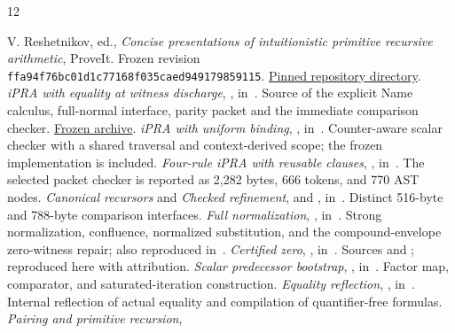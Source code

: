 \begin{thebibliography}{12}\raggedright
{}
V. Reshetnikov, ed., \emph{Concise presentations of intuitionistic primitive
recursive arithmetic}, ProveIt. Frozen revision
\texttt{ffa94f76bc01d1c77168f035caed949179859115}.
\href{https://github.com/VladimirReshetnikov/ProveIt/tree/ffa94f76bc01d1c77168f035caed949179859115/Logic/PrimitiveRecursiveArithmetic/ConciseIPRA}{Pinned repository directory}.
\emph{iPRA with equality at witness discharge},
,
in~\cite{baseline}. Source of the explicit Name calculus, full-normal
interface, parity packet and the immediate comparison checker.
\href{https://github.com/VladimirReshetnikov/ProveIt/blob/ffa94f76bc01d1c77168f035caed949179859115/Logic/PrimitiveRecursiveArithmetic/ConciseIPRA/docs/incoming/ipra_witness_discharge_2026-11-11.zip}{Frozen archive}.
\emph{iPRA with uniform binding},
,
in~\cite{baseline}. Counter-aware scalar checker with a shared traversal
and context-derived scope; the frozen implementation is included.
\emph{Four-rule iPRA with reusable clauses},
,
in~\cite{baseline}. The selected packet checker is reported as
2,282 bytes, 666 tokens, and 770 AST nodes.
\emph{Canonical recursors} and \emph{Checked refinement},
and ,
in~\cite{baseline}. Distinct 516-byte and 788-byte comparison interfaces.
\emph{Full normalization}, ,
in~\cite{baseline}. Strong normalization, confluence, normalized substitution,
and the compound-envelope zero-witness repair; also reproduced in~\cite{prior}.
\emph{Certified zero}, ,
in~\cite{baseline}. Sources  and
; reproduced here with attribution.
\emph{Scalar predecessor bootstrap},
,
in~\cite{baseline}. Factor map, comparator, and saturated-iteration construction.
\emph{Equality reflection},
,
in~\cite{baseline}. Internal reflection of actual equality and compilation
of quantifier-free formulas.
\emph{Pairing and primitive recursion},

\end{thebibliography}
